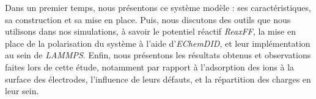Dans un premier temps, nous présentons ce système modèle : ses caractéristiques, sa construction et sa mise en place.
Puis, nous discutons des outils que nous utilisons dans nos simulations, à savoir le potentiel réactif \emph{ReaxFF}\cite{van_duin_reaxff_2001}\cite{russo_atomistic-scale_2011}\cite{senftle_reaxff_2016}, la mise en place de la polarisation du système à l'aide d'\emph{EChemDID}\cite{onofrio_voltage_2015}, et leur implémentation au sein de \emph{LAMMPS}.
Enfin, nous présentons les résultats obtenus et observations faites lors de cette étude, notamment par rapport à l'adsorption des ions à la surface des électrodes, l'influence de leurs défauts, et la répartition des charges en leur sein.
